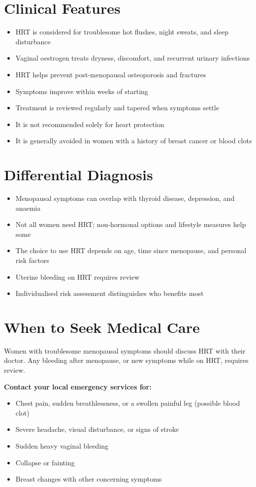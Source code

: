 \section*{Clinical Features}
\begin{itemize}
    \item HRT is considered for troublesome hot flushes, night sweats, and sleep disturbance
    \item Vaginal oestrogen treats dryness, discomfort, and recurrent urinary infections
    \item HRT helps prevent post-menopausal osteoporosis and fractures
    \item Symptoms improve within weeks of starting
    \item Treatment is reviewed regularly and tapered when symptoms settle
    \item It is not recommended solely for heart protection
    \item It is generally avoided in women with a history of breast cancer or blood clots
\end{itemize}

\section*{Differential Diagnosis}
\begin{itemize}
    \item Menopausal symptoms can overlap with thyroid disease, depression, and anaemia
    \item Not all women need HRT; non-hormonal options and lifestyle measures help some
    \item The choice to use HRT depends on age, time since menopause, and personal risk factors
    \item Uterine bleeding on HRT requires review
    \item Individualised risk assessment distinguishes who benefits most
\end{itemize}

\section*{When to Seek Medical Care}
Women with troublesome menopausal symptoms should discuss HRT with their doctor. Any bleeding after menopause, or new symptoms while on HRT, requires review.

\textbf{Contact your local emergency services for:}
\begin{itemize}
    \item Chest pain, sudden breathlessness, or a swollen painful leg (possible blood clot)
    \item Severe headache, visual disturbance, or signs of stroke
    \item Sudden heavy vaginal bleeding
    \item Collapse or fainting
    \item Breast changes with other concerning symptoms
\end{itemize}

